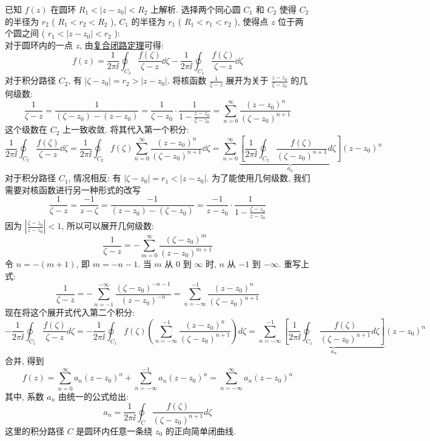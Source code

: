         \begin{prf}
            已知  \(f(z)\)  在圆环  \(R_1 < |z - z_0| < R_2\)  上解析. 选择两个同心圆  \(C_1\)  和  \(C_2\)  使得  \(C_2\)  的半径为  \(r_2\)  ( \(R_1 < r_2 < R_2\) ),  \(C_1\)  的半径为  \(r_1\)  ( \(R_1 < r_1 < r_2\) ), 使得点  \(z\)  位于两个圆之间 ( \(r_1 < |z - z_0| < r_2\) ):\\
            对于圆环内的一点  \(z\), 由\hyperref[thm:Combined-Closed-Circuit]{复合闭路定理}可得: 
            \[f(z) = \frac{1}{2\pi\ii} \oint_{C_2} \frac{f(\zeta)}{\zeta - z} \dd\zeta - \frac{1}{2\pi\ii} \oint_{C_1} \frac{f(\zeta)}{\zeta - z}  \dd\zeta\]
            对于积分路径  \(C_2\), 有  \(|\zeta - z_0| = r_2 > |z - z_0|\). 将核函数  \(\frac{1}{\zeta - z}\)  展开为关于  \(\frac{z-z_0}{\zeta-z_0}\)  的几何级数: 
            \[\frac{1}{\zeta - z} = \frac{1}{(\zeta - z_0) - (z - z_0)} = \frac{1}{\zeta - z_0} \cdot \frac{1}{1 - \frac{z-z_0}{\zeta-z_0}} = \sum_{n=0}^{\infty} \frac{(z - z_0)^n}{(\zeta - z_0)^{n+1}}\]
            这个级数在  \(C_2\)  上一致收敛. 将其代入第一个积分: 
            \[\frac{1}{2\pi\ii} \oint_{C_2} \frac{f(\zeta)}{\zeta - z} \dd\zeta = \frac{1}{2\pi\ii} \oint_{C_2} f(\zeta) \sum_{n=0}^{\infty} \frac{(z - z_0)^n}{(\zeta - z_0)^{n+1}} \dd\zeta = \sum_{n=0}^{\infty} \underbrace{\left[ \frac{1}{2\pi\ii} \oint_{C_2} \frac{f(\zeta)}{(\zeta - z_0)^{n+1}} d\zeta \right]}_{a_n} (z - z_0)^n\]
            对于积分路径  \(C_1\), 情况相反: 有  \(|\zeta - z_0| = r_1 < |z - z_0|\). 为了能使用几何级数, 我们需要对核函数进行另一种形式的改写
            \[\frac{1}{\zeta - z} = \frac{-1}{z - \zeta} = \frac{-1}{(z - z_0) - (\zeta - z_0)} = \frac{-1}{z - z_0} \cdot \frac{1}{1 - \frac{\zeta-z_0}{z-z_0}}\]
            因为  \(\left| \frac{\zeta-z_0}{z-z_0} \right| < 1\), 所以可以展开几何级数: 
            \[\frac{1}{\zeta - z} = -\sum_{m=0}^{\infty} \frac{(\zeta - z_0)^m}{(z - z_0)^{m+1}}\]
            令  \(n = -(m+1)\), 即  \(m = -n - 1\). 当  \(m\)  从  \(0\)  到  \(\infty\)  时,  \(n\)  从  \(-1\)  到  \(-\infty\). 重写上式: 
            \[\frac{1}{\zeta - z} = -\sum_{n=-1}^{-\infty} \frac{(\zeta - z_0)^{-n-1}}{(z - z_0)^{-n}} = \sum_{n=-\infty}^{-1} \frac{(z - z_0)^n}{(\zeta - z_0)^{n+1}}\]
            现在将这个展开式代入第二个积分: 
            \[-\frac{1}{2\pi\ii} \oint_{C_1} \frac{f(\zeta)}{\zeta - z}  d\zeta = -\frac{1}{2\pi\ii} \oint_{C_1} f(\zeta) \left( \sum_{n=-\infty}^{-1} \frac{(z - z_0)^n}{(\zeta - z_0)^{n+1}} \right) d\zeta = \sum_{n=-\infty}^{-1} \underbrace{\left[ \frac{1}{2\pi\ii} \oint_{C_1} \frac{f(\zeta)}{(\zeta - z_0)^{n+1}} d\zeta \right]}_{a_n} (z - z_0)^n\]
            合并, 得到
            \[f(z) = \sum_{n=0}^{\infty} a_n (z - z_0)^n + \sum_{n=-\infty}^{-1} a_n (z - z_0)^n = \sum_{n=-\infty}^{\infty} a_n (z - z_0)^n\]
            其中, 系数  \(a_n\)  由统一的公式给出: 
            \[a_n = \frac{1}{2\pi\ii} \oint_C \frac{f(\zeta)}{(\zeta - z_0)^{n+1}}  d\zeta\]
            这里的积分路径  \(C\)  是圆环内任意一条绕  \(z_0\)  的正向简单闭曲线. 
        \end{prf}

